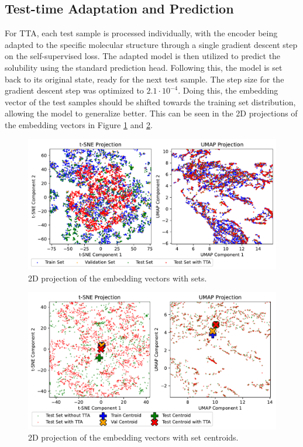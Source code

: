 \documentclass[11pt,a4paper]{article}
\begin{document}
\subsection{Test-time Adaptation and Prediction}

For TTA, each test sample is processed individually, with the encoder being adapted to the specific molecular structure through a single gradient descent step on the self-supervised loss. The adapted model is then utilized to predict the solubility using the standard prediction head. Following this, the model is set back to its original state, ready for the next test sample. The step size for the gradient descent step was optimized to $2.1 \cdot 10^{-4}$. Doing this, the embedding vector of the test samples should be shifted towards the training set distribution, allowing the model to generalize better. This can be seen in the 2D projections of the embedding vectors in Figure \ref{fig:sets} and \ref{fig:sets_TTA}.

\begin{figure}[htbp]
        \centering
        \includegraphics[width=1\textwidth]{sets.pdf}
        \caption{2D projection of the embedding vectors with sets.}
        \label{fig:sets}
\end{figure}

\begin{figure}[htbp]
        \centering
        \includegraphics[width=1\textwidth]{sets_TTA.pdf}
        \caption{2D projection of the embedding vectors with set centroids.}
        \label{fig:sets_TTA}
\end{figure}
\end{document}
